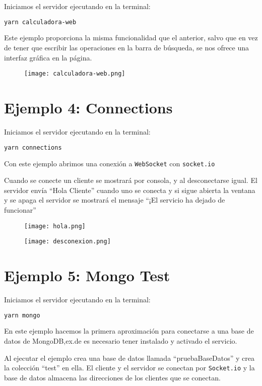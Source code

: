 Iniciamos el servidor ejecutando en la terminal:
\begin{lstlisting}[language=sh]
	yarn calculadora-web
\end{lstlisting}

Este ejemplo proporciona la misma funcionalidad que el anterior, salvo que en vez de
tener que escribir las operaciones en la barra de búsqueda, se nos ofrece una interfaz
gráfica en la página.

\begin{figure}[!ht]
	\begin{center}
		\texttt{[image: calculadora-web.png]}
	\end{center}
\end{figure}

\section{Ejemplo 4: Connections}
Iniciamos el servidor ejecutando en la terminal:
\begin{lstlisting}[language=sh]
	yarn connections
\end{lstlisting}

Con este ejemplo abrimos una conexión a \texttt{WebSocket} con \texttt{socket.io}

Cuando se conecte un cliente se mostrará por consola, y al desconectarse igual. El servidor
envía ``Hola Cliente'' cuando uno se conecta y si sigue abierta la ventana y se apaga el servidor
se mostrará el mensaje ``¡El servicio ha dejado de funcionar''

\begin{figure}[!ht]
	\begin{center}
		\texttt{[image: hola.png]}
	\end{center}
\end{figure}

\begin{figure}[!ht]
	\begin{center}
		\texttt{[image: desconexion.png]}
	\end{center}
\end{figure}

\section{Ejemplo 5: Mongo Test}
Iniciamos el servidor ejecutando en la terminal:
\begin{lstlisting}[language=sh]
	yarn mongo
\end{lstlisting}

En este ejemplo hacemos la primera aproximación para conectarse a una base de datos de MongoDB,ex.de
es necesario tener instalado y activado el servicio.

Al ejecutar el ejemplo crea una base de datos llamada ``pruebaBaseDatos'' y
crea la colección ``test'' en ella. El cliente y el servidor se conectan por
\texttt{Socket.io} y la base de datos almacena las direcciones de los
clientes que se conectan.
